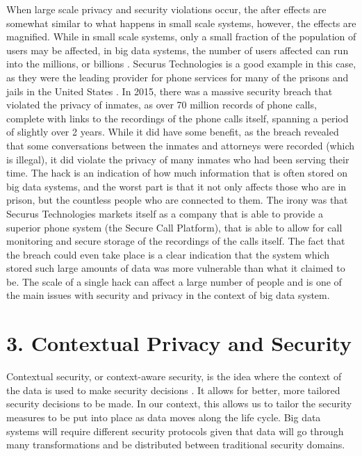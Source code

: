 \documentclass{sigchi}
\begin{document}
When large scale privacy and security violations occur, the after effects are somewhat similar to what happens in small scale systems, however, the effects are magnified. While in small scale systems, only a small fraction of the population of users may be affected, in big data systems, the number of users  affected can run into the millions, or billions \cite{yahooHack}. Securus Technologies is a good example in this case, as they were the leading provider for phone services for many of the prisons and jails in the United States \cite{smithlee_2015}. In 2015, there was a massive security breach that violated the privacy of inmates, as over 70 million records of phone calls, complete with links to the recordings of the phone calls itself, spanning a period of slightly over 2 years. While it did have some benefit, as the breach revealed that some conversations between the inmates and attorneys were recorded (which is illegal), it did violate the privacy of many inmates who had been serving their time. The hack is an indication of how much information that is often stored on big data systems, and the worst part is that it not only affects those who are in prison, but the countless people who are connected to them. The irony was that Securus Technologies markets itself as a company that is able to provide a superior phone system (the Secure Call Platform), that is able to allow for call monitoring and secure storage of the recordings of the calls itself. The fact that the breach could even take place is a clear indication that the system which stored such large amounts of data was more vulnerable than what it claimed to be. The scale of a  single hack can affect a large number of people and is one of the main issues with security and privacy in the context of big data system.

\section{3. Contextual Privacy and Security}

Contextual security, or context-aware security, is the idea where the context of the data is used to make security decisions \cite{8_rouse_2013} \cite{10_peterson_2015}. It allows for better, more tailored security decisions to be made. In our context, this allows us to tailor the security measures to be put into place as data moves along the life cycle. Big data systems will require different security protocols given that data will go through many transformations and be distributed between traditional security domains.
\end{document}
